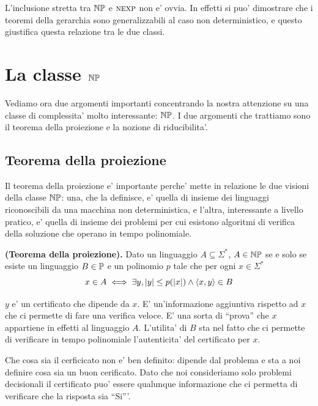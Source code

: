 L'inclusione stretta tra $\mathbb{NP}$ e $\textsc{nexp}$ non e' ovvia. In effetti si puo' dimostrare che i
teoremi della gerarchia sono generalizzabili al caso non deterministico, e questo giustifica questa
relazione tra le due classi.


\section{La classe $\mathbb{NP}$}

Vediamo ora due argomenti importanti concentrando la nostra attenzione su una classe di complessita'
molto interessante: $\mathbb{NP}$. I due argomenti che trattiamo sono il teorema della proiezione e la
nozione di riducibilita'.

\subsection{Teorema della proiezione}

Il teorema della proiezione e' importante perche' mette in relazione le due visioni della classe
$\mathbb{NP}$: una, che la definisce, e' quella di insieme dei linguaggi riconoscibili da una macchina
non deterministica, e l'altra, interessante a livello pratico, e' quella di insieme dei problemi per
cui esistono algoritmi di verifica della soluzione che operano in tempo polinomiale.

\begin{thm}
    \textbf{(Teorema della proiezione).} Dato un linguaggio $A \subseteq \Sigma^{*}$, $A \in
    \mathbb{NP}$ se e solo se esiste un linguaggio $B \in \mathbb{P}$ e un polinomio $p$ tale che per ogni
    $x \in \Sigma^{*}$
    \begin{equation*}
        x \in A \iff \exists y, |y| \leq p(|x|) \land \langle x, y \rangle \in B
    \end{equation*}
\end{thm}

$y$ e' un certificato che dipende da $x$. E' un'informazione aggiuntiva rispetto ad $x$ che ci
permette di fare una verifica veloce. E' una sorta di ``prova'' che $x$ appartiene in effetti al
linguaggio $A$. L'utilita' di $B$ sta nel fatto che ci permette di verificare in tempo polinomiale
l'autenticita' del certificato per $x$.

Che cosa sia il cerficicato non e' ben definito: dipende dal problema e sta a noi definire cosa sia
un buon cerificato. Dato che noi consideriamo solo problemi decisionali il certificato puo' essere
qualunque informazione che ci permetta di verificare che la risposta sia ``Si'''.

